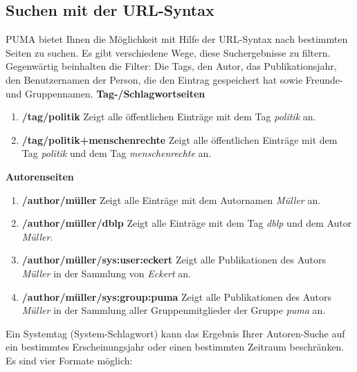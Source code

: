 \subsection{Suchen mit der URL-Syntax}
\label{subsec:suchenMitUrlSyntax}
PUMA bietet Ihnen die Möglichkeit mit Hilfe der URL-Syntax nach bestimmten Seiten zu suchen. Es gibt verschiedene Wege, diese Suchergebnisse zu filtern. Gegenwärtig beinhalten die Filter: Die Tags, den Autor, das Publikationsjahr, den Benutzernamen der Person, die den Eintrag gespeichert hat sowie Freunde- und Gruppennamen. \newline
\newline
\textbf{Tag-/Schlagwortseiten}
\begin{enumerate}
    \item \textbf{/tag/politik} \newline
    Zeigt alle öffentlichen Einträge mit dem Tag \textit{politik} an.
    \item \textbf{/tag/politik+menschenrechte}\newline
    Zeigt alle öffentlichen Einträge mit dem Tag \textit{politik} und dem Tag \textit{menschenrechte} an.
\end{enumerate}
\textbf{Autorenseiten}
\begin{enumerate}
    \item \textbf{/author/müller} \newline
    Zeigt alle Einträge mit dem Autornamen \textit{Müller} an.
    \item \textbf{/author/müller/dblp} \newline
    Zeigt alle Einträge mit dem Tag \textit{dblp} und dem Autor \textit{Müller}.
    \item \textbf{/author/müller/sys:user:eckert}\newline
    Zeigt alle Publikationen des Autors \textit{Müller} in der Sammlung von \textit{Eckert} an.
    \item \textbf{/author/müller/sys:group:puma} \newline
    Zeigt alle Publikationen des Autors \textit{Müller} in der Sammlung aller Gruppenmitglieder der Gruppe \textit{puma} an. 
\end{enumerate}
Ein Systemtag (System-Schlagwort) kann das Ergebnis Ihrer Autoren-Suche auf ein bestimmtes Erscheinungsjahr oder einen bestimmten Zeitraum beschränken. Es sind vier Formate möglich:%
